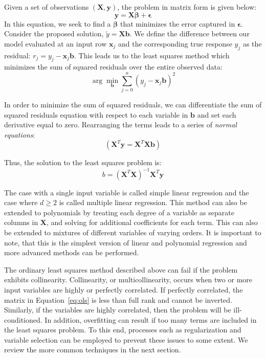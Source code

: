 Given a set of observations $(\mathbf{X},\mathbf{y})$, the problem in matrix form is given below:
%
\begin{equation}
\mathbf{y} = \mathbf{X}\boldsymbol\beta + \boldsymbol\epsilon
\end{equation}
%
In this equation, we seek to find a $\boldsymbol\beta$ that minimizes the error captured in $\boldsymbol\epsilon$.
%
Consider the proposed solution, $\tilde{y} = \mathbf{X}\mathbf{b}$.
%
We define the difference between our model evaluated at an input row $\mathbf{x}_j$ and the corresponding true response $y_j$ as the residual: $r_j = y_j - \mathbf{x}_j\mathbf{b}$.
%
This leads us to the least squares method which minimizes the sum of squared residuals over the entire observed data:
\begin{equation}
\arg\min_{\mathbf{b}} \sum_{j=0}^n(y_j - \mathbf{x}_j\mathbf{b})^2
\end{equation}

In order to minimize the sum of squared residuals, we can differentiate the sum of squared residuals equation with respect to each variable in $\mathbf{b}$ and set each derivative equal to zero.
%
Rearranging the terms leads to a series of \emph{normal equations}:
\begin{equation}
(\mathbf{X}^T\mathbf{y}= \mathbf{X}^T\mathbf{X}\mathbf{b})
\end{equation}

Thus, the solution to the least squares problem is:
\begin{equation}
b = (\mathbf{X}^T \mathbf{X})^{-1} \mathbf{X}^T \mathbf{y}
\label{eq:ols}
\end{equation}

The case with a single input variable is called simple linear regression and the case where $d\geq 2$ is called multiple linear regression.
%
This method can also be extended to polynomials by treating each degree of a variable as separate columns in $\mathbf{X}$, and solving for additional coefficients for each term.
%
This can also be extended to mixtures of different variables of varying orders.
%
It is important to note, that this is the simplest version of linear and polynomial regression and more advanced methods can be performed.

The ordinary least squares method described above can fail if the problem exhibits collinearity.
%
Collinearity, or multicollinearity, occurs when two or more input variables are highly or perfectly correlated.
%
If perfectly correlated, the matrix in Equation~\ref{eq:ols} is less than full rank and cannot be inverted.
%
Similarly, if the variables are highly correlated, then the problem will be ill-conditioned.
%
In addition, overfitting can result if too many terms are included in the least squares problem.
%
To this end, processes such as regularization and variable selection can be employed to prevent these issues to some extent.
%
We review the more common techniques in the next section.

